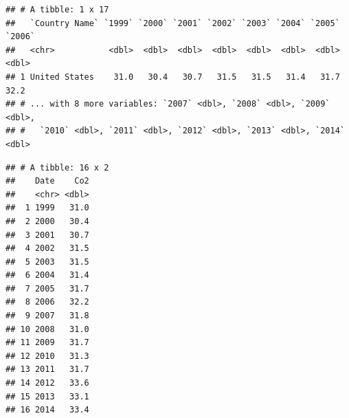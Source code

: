 \documentclass[]{article}
\newenvironment{Shaded}{\begin{snugshade}}{\end{snugshade}}
\newcommand{\KeywordTok}[1]{\textcolor[rgb]{0.13,0.29,0.53}{\textbf{#1}}}
\newcommand{\DataTypeTok}[1]{\textcolor[rgb]{0.13,0.29,0.53}{#1}}
\newcommand{\DecValTok}[1]{\textcolor[rgb]{0.00,0.00,0.81}{#1}}
\newcommand{\StringTok}[1]{\textcolor[rgb]{0.31,0.60,0.02}{#1}}
\newcommand{\OperatorTok}[1]{\textcolor[rgb]{0.81,0.36,0.00}{\textbf{#1}}}
\newcommand{\NormalTok}[1]{#1}
\begin{document}
\begin{verbatim}
## # A tibble: 1 x 17
##   `Country Name` `1999` `2000` `2001` `2002` `2003` `2004` `2005` `2006`
##   <chr>           <dbl>  <dbl>  <dbl>  <dbl>  <dbl>  <dbl>  <dbl>  <dbl>
## 1 United States    31.0   30.4   30.7   31.5   31.5   31.4   31.7   32.2
## # ... with 8 more variables: `2007` <dbl>, `2008` <dbl>, `2009` <dbl>,
## #   `2010` <dbl>, `2011` <dbl>, `2012` <dbl>, `2013` <dbl>, `2014` <dbl>
\end{verbatim}

\begin{Shaded}
\end{Shaded}

\begin{verbatim}
## # A tibble: 16 x 2
##    Date    Co2
##    <chr> <dbl>
##  1 1999   31.0
##  2 2000   30.4
##  3 2001   30.7
##  4 2002   31.5
##  5 2003   31.5
##  6 2004   31.4
##  7 2005   31.7
##  8 2006   32.2
##  9 2007   31.8
## 10 2008   31.0
## 11 2009   31.7
## 12 2010   31.3
## 13 2011   31.7
## 14 2012   33.6
## 15 2013   33.1
## 16 2014   33.4
\end{verbatim}

\begin{Shaded}
\end{Shaded}
\end{document}
